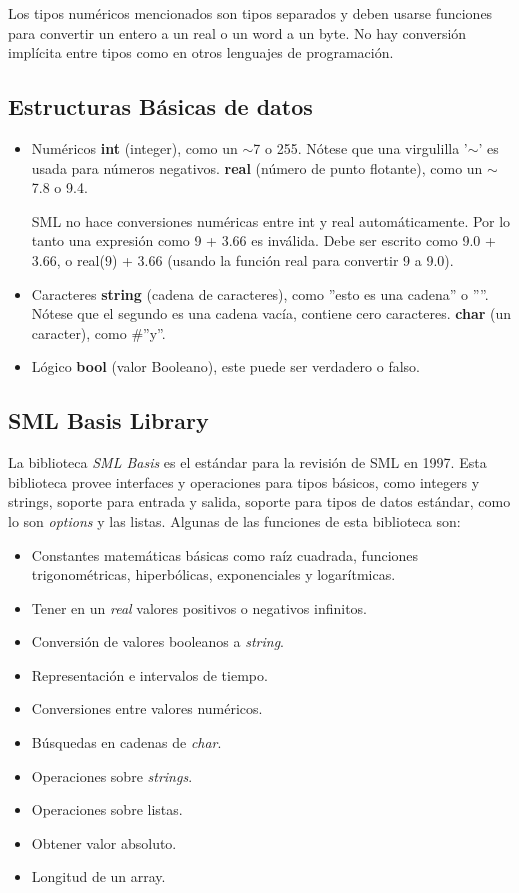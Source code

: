 \documentclass[10pt,journal,compsoc]{IEEEtran}
\begin{document}
Los tipos num\'ericos mencionados son tipos separados y deben usarse funciones para convertir un entero a un real o un word a un byte. No hay conversi\'on impl\'icita entre tipos como en otros lenguajes de programaci\'on.

\subsection{Estructuras B\'asicas de datos}
\begin{itemize}
	\item Num\'ericos
		\subitem \textbf{int} (integer), como un $\sim$7 o 255. N\'otese que una virgulilla '$\sim$' es usada para n\'umeros negativos.
		\subitem \textbf{real} (n\'umero de punto flotante), como un $\sim$7.8 o 9.4. 
		
		\subitem SML no hace conversiones num\'ericas entre int y real autom\'aticamente. Por lo tanto una expresi\'on como 9 + 3.66 es inv\'alida. Debe ser escrito como 9.0 + 3.66, o real(9) + 3.66 (usando la funci\'on real para convertir 9 a 9.0).
		
	\item Caracteres
		\subitem \textbf{string} (cadena de caracteres), como ''esto es una cadena'' o ''''. N\'otese que el segundo es una cadena vac\'ia, contiene cero caracteres.
		\subitem \textbf{char} (un caracter), como \#''y''.
	
	\item L\'ogico
		\subitem \textbf{bool} (valor Booleano), este puede ser verdadero o falso.
\end{itemize}		
\subsection{SML Basis Library}
La biblioteca \textit{SML Basis} es el est\'andar para la revisi\'on de SML en 1997. Esta biblioteca provee interfaces y operaciones para tipos b\'asicos, como integers y strings, soporte para entrada y salida, soporte para tipos de datos est\'andar, como lo son \textit{options} y las listas. Algunas de las funciones de esta biblioteca son:
\begin{itemize}
	\item Constantes matem\'aticas b\'asicas como ra\'iz cuadrada, funciones trigonom\'etricas, hiperb\'olicas, exponenciales y logar\'itmicas.
	\item Tener en un \textit{real} valores positivos o negativos infinitos.
	\item Conversi\'on de valores booleanos a \textit{string}.
	\item Representaci\'on e intervalos de tiempo.
	\item Conversiones entre valores num\'ericos.
	\item B\'usquedas en cadenas de \textit{char}.
	\item Operaciones sobre \textit{strings}.
	\item Operaciones sobre listas.
	\item Obtener valor absoluto.
	\item Longitud de un array.
\end{itemize}
\end{document}
